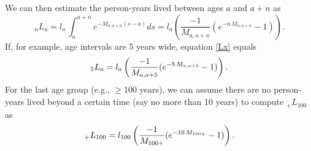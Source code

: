 \documentclass[11pt,letterpaper]{article}
\theoremstyle{plain}
\theoremstyle{remark}
\numberwithin{equation}{section}
\begin{document}
We can then estimate the person-years lived between ages $a$ and $a+n$
as
\begin{equation}
_nL_{a}=l_a\,\int_a^{a+n} e^{-M_{a,a+n}(s-a)} ds=l_a \left(\frac{-1}{M_{a,a+n}}(e^{-n\,M_{a,a+n}}-1) \right).
\label{Lx}
\end{equation}
If, for example, age intervals are 5 years wide, equation \eqref{Lx}
equals
\begin{equation}
_5L_{a}=l_a \left(\frac{-1}{M_{a,a+5}}(e^{-5\,M_{a,a+5}}-1) \right).\notag
\end{equation}
For the last age group (e.g., $\geq$100 years), we can assume there
are no person-years lived beyond a certain time (say no more than 10
years) to compute $_+L_{100}$ as
\begin{equation}
_+L_{100}=l_{100} \left(\frac{-1}{M_{100+}}(e^{-10\,M_{100+}}-1) \right).\notag
\end{equation}


\newpage
\end{document}
